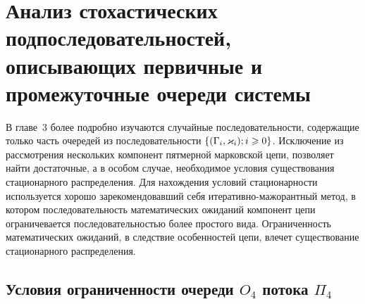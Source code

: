 \documentclass[a4paper,12pt,russian]{extarticle}
\newcommand{\Mark}{\{(\Gamma_i, \varkappa_i); \hm{} i \geqslant 0\}}
\begin{document}
\section{Анализ стохастических подпоследовательностей, описывающих первичные и промежуточные очереди системы}
В главе~3 более подробно изучаются случайные последовательности, содержащие только часть очередей из последовательности $\Mark$. Исключение из рассмотрения нескольких компонент пятмерной марковской цепи, позволяет найти достаточные, а в особом случае, необходимое условия существования стационарного распределения. Для нахождения условий стационарности используется хорошо зарекомендовавший себя итеративно-мажорантный метод, в котором последовательность математических ожиданий компонент цепи ограничевается последовательностью более простого вида.
Ограниченность математических ожиданий, в следствие особенностей цепи, влечет существование стационарного распределения.

\subsection{Условия ограниченности очереди $O_4$ потока $\Pi_4$}
\end{document}
